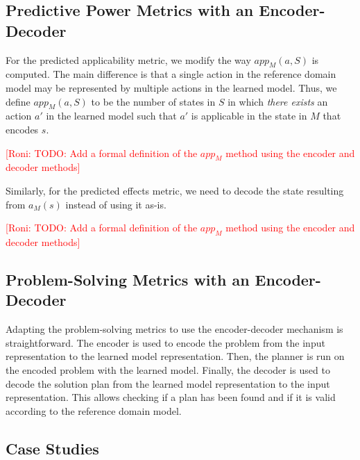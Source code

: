 \documentclass{article}
\theoremstyle{definition}
\theoremstyle{remark}
\newcommand{\app}{\ensuremath{\textit{app}}\xspace}
\newcommand{\roni}[1]{{\textcolor{red}{[Roni: #1]}}}
\begin{document}

\subsection{Predictive Power Metrics with an Encoder-Decoder}
For the predicted applicability metric, we modify the way $\app_M(a,S)$ is computed. The main difference is that a single action in the reference domain model may be represented by multiple actions in the learned model. 
Thus, we define 
$\app_M(a,S)$ to be the number of states in $S$ in which \emph{there exists} an action $a'$ in the learned model such that $a'$ is applicable in the state in $M$ that encodes $s$. 

\roni{TODO: Add a formal definition of the $app_M$ method using the encoder and decoder methods}

Similarly, for the predicted effects metric, we need to decode the state resulting from $a_M(s)$ instead of using it as-is. 

\roni{TODO: Add a formal definition of the $app_M$ method using the encoder and decoder methods}

\subsection{Problem-Solving Metrics with an Encoder-Decoder}

Adapting the problem-solving metrics to use the encoder-decoder mechanism is straightforward.
The encoder is used to encode the problem from the input representation to the learned model representation. 
Then, the planner is run on the encoded problem with the learned model. 
Finally, the decoder is used to decode the solution plan from the learned model representation to the input representation. 
This allows checking if a plan has been found and if it is valid according to the reference domain model. 


\subsection{Case Studies}
\end{document}
